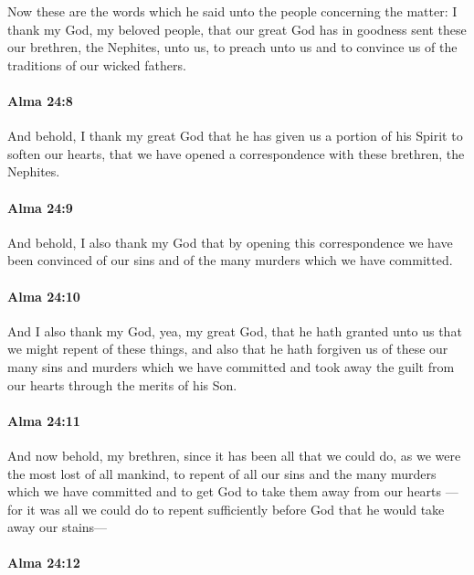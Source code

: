 			Now these are the words which he said unto the people concerning the matter:
			I thank my God, my beloved people,
			that our great God has in goodness sent these our brethren, the Nephites, unto us,
			to preach unto us and to convince us of the traditions of our wicked fathers.

		\paragraph{Alma 24:8} %
			\label{ALMA-24-8}

			And behold, I thank my great God
			that he has given us a portion of his Spirit to soften our hearts,
			that we have opened a correspondence with these brethren, the Nephites.

		\paragraph{Alma 24:9} %
			\label{ALMA-24-9}

			And behold, I also thank my God that by opening this correspondence
			we have been convinced of our sins
			and of the many murders which we have committed.

		\paragraph{Alma 24:10} %
			\label{ALMA-24-10}

			And I also thank my God, yea, my great God,
			that he hath granted unto us that we might repent of these things,
			and also that he hath forgiven us
			of these our many sins and murders which we have committed
			and took away the guilt from our hearts through the merits of his Son.

		\paragraph{Alma 24:11} %
			\label{ALMA-24-11}

			And now behold, my brethren,
			since it has been all that we could do,
			as we were the most lost of all mankind,
			to repent of all our sins and the many murders which we have committed
			and to get God to take them away from our hearts
			---for it was all we could do to repent sufficiently before God
			that he would take away our stains---

		\paragraph{Alma 24:12} %
			\label{ALMA-24-12}


